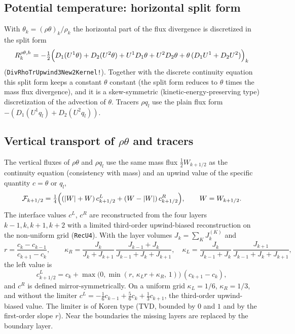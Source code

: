 \documentclass[11pt,a4paper]{article}
\newcommand{\code}[1]{\texttt{#1}}
\begin{document}
\subsection{Potential temperature: horizontal split form}

With $\theta_k = (\rho\theta)_k/\rho_k$ the horizontal part of the flux
divergence is discretized in the split form
\begin{equation}
  R^{\rho\theta,h}_k = -\tfrac12\Bigl(D_1(U^1\theta) + D_2(U^2\theta)
    + U^1 D_1\theta + U^2 D_2\theta + \theta\,(D_1 U^1 + D_2 U^2)\Bigr)_k
\end{equation}
(\code{DivRhoTrUpwind3New2Kernel!}). Together with the discrete continuity
equation this split form keeps a constant $\theta$ constant (the
split form reduces to $\theta$ times the mass flux divergence), and it is a
skew-symmetric (kinetic-energy-preserving type) discretization of the
advection of $\theta$. Tracers $\rho q_l$ use the plain flux form
$-(D_1(U^1 q_l) + D_2(U^2 q_l))$.

\subsection{Vertical transport of \texorpdfstring{$\rho\theta$}{rho theta} and tracers}
\label{sec:upwind}

The vertical fluxes of $\rho\theta$ and $\rho q_l$ use the same mass flux
$\tfrac12 W_{k+1/2}$ as the continuity equation (consistency with mass) and
an upwind value of the specific quantity $c = \theta$ or $q_l$,
\begin{equation}
  \mathcal{F}_{k+1/2} = \tfrac14\Bigl((|W| + W)\,c^{L}_{k+1/2}
    + (W - |W|)\,c^{R}_{k+1/2}\Bigr), \qquad W = W_{k+1/2}.
\end{equation}
The interface values $c^{L}$, $c^{R}$ are reconstructed from the four layers
$k-1,k,k+1,k+2$ with a limited third-order upwind-biased reconstruction on
the non-uniform grid (\code{RecU4}). With the layer volumes
$J_k = \sum_K J^{(K)}_k$ and
\begin{equation}
  r = \frac{c_k - c_{k-1}}{c_{k+1} - c_k}, \qquad
  \kappa_R = \frac{J_k}{J_k+J_{k+1}}\,\frac{J_{k-1}+J_k}{J_{k-1}+J_k+J_{k+1}},\quad
  \kappa_L = \frac{J_k}{J_{k-1}+J_k}\,\frac{J_{k+1}}{J_{k-1}+J_k+J_{k+1}},
\end{equation}
the left value is
\begin{equation}
  c^{L}_{k+1/2} = c_k + \max\bigl(0, \min(r,\, \kappa_L r + \kappa_R,\, 1)\bigr)\,(c_{k+1}-c_k),
\end{equation}
and $c^R$ is defined mirror-symmetrically. On a uniform grid
$\kappa_L = 1/6$, $\kappa_R = 1/3$, and without the limiter
$c^L = -\tfrac16 c_{k-1} + \tfrac56 c_k + \tfrac13 c_{k+1}$, the
third-order upwind-biased value. The limiter is of Koren type \cite{Koren1993} (TVD, bounded by
$0$ and $1$ and by the first-order slope $r$). Near the boundaries the missing
layers are replaced by the boundary layer.
\end{document}
